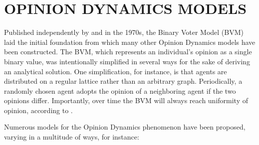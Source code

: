 
\section{OPINION DYNAMICS MODELS}

Published independently by \cite{clifford_model_1973} and
\cite{holley_ergodic_1975} in the 1970s, the Binary Voter Model (BVM) laid the
initial foundation from which many other Opinion Dynamics models have been
constructed. The BVM, which represents an individual's opinion as a single
binary value, was intentionally simplified in several ways for the sake of
deriving an analytical solution. One simplification, for instance, is that
agents are distributed on a regular lattice rather than an arbitrary graph.
Periodically, a randomly chosen agent adopts the opinion of a neighboring
agent if the two opinions differ. Importantly, over time the BVM will always
reach uniformity of opinion, according to \cite[ch.~14]{aldous-fill-2014}.

Numerous models for the Opinion Dynamics phenomenon have been proposed,
varying in a multitude of ways, for instance:

